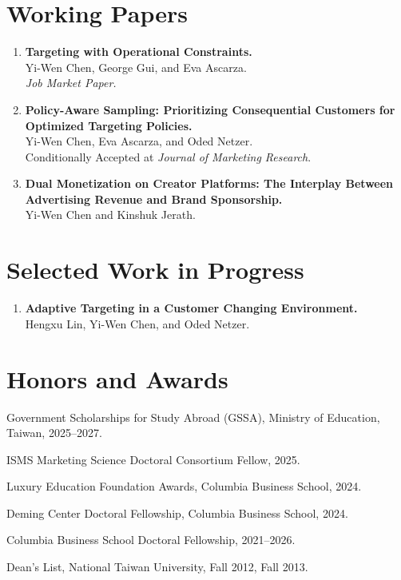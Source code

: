 \documentclass[12pt, letterpaper]{article}
\newenvironment{cvblock}{%
  \begin{list}{}{%
    \setlength{\leftmargin}{0.35in}%
    \setlength{\rightmargin}{0pt}%
    \setlength{\topsep}{2pt}%
    \setlength{\parsep}{0pt}%
    \setlength{\itemsep}{0pt}%
    \setlength{\partopsep}{0pt}%
  }%
  \item[]%
}{%
  \end{list}%
}
\begin{document}
\section{Working Papers}
\begin{enumerate}[leftmargin=0.55in, label=\arabic*., itemsep=10pt, topsep=4pt, parsep=0pt]

\item \textbf{Targeting with Operational Constraints.}\\
Yi-Wen Chen, George Gui, and Eva Ascarza.\\
\textit{Job Market Paper.}

\item \textbf{Policy-Aware Sampling: Prioritizing Consequential Customers for Optimized Targeting Policies.}\\
Yi-Wen Chen, Eva Ascarza, and Oded Netzer.\\
Conditionally Accepted at \textit{Journal of Marketing Research}.

\item \textbf{Dual Monetization on Creator Platforms: The Interplay Between Advertising Revenue and Brand Sponsorship.}\\
Yi-Wen Chen and Kinshuk Jerath.

\end{enumerate}

\section{Selected Work in Progress}
\begin{enumerate}[leftmargin=0.55in, label=\arabic*., itemsep=10pt, topsep=4pt, parsep=0pt]

\item\textbf{Adaptive Targeting in a Customer Changing Environment.}\\
Hengxu Lin, Yi-Wen Chen, and Oded Netzer.

\end{enumerate}

\newpage
\section{Honors and Awards}
\begin{cvblock}
Government Scholarships for Study Abroad (GSSA), Ministry of Education, Taiwan, 2025--2027.

\smallskip
ISMS Marketing Science Doctoral Consortium Fellow, 2025.

\smallskip
Luxury Education Foundation Awards, Columbia Business School, 2024.

\smallskip
Deming Center Doctoral Fellowship, Columbia Business School, 2024.

\smallskip
Columbia Business School Doctoral Fellowship, 2021--2026.

\smallskip
Dean's List, National Taiwan University, Fall 2012, Fall 2013.
\end{cvblock}
\end{document}
